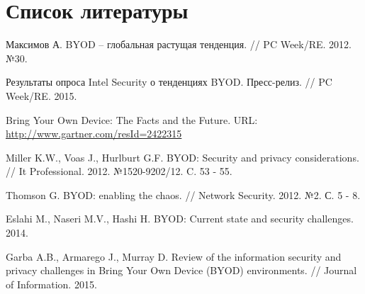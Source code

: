 \documentclass[a4paper, 12pt]{article}		%
\begin{document}
\section{Список литературы}

\begin{thebibliography}{00}

 Максимов А. BYOD -- глобальная растущая тенденция. // PC Week/RE. 2012. №30.

Результаты опроса Intel Security о тенденциях BYOD. Пресс-релиз. // PC Week/RE. 2015.

Bring Your Own Device: The Facts and the Future. URL: \url{http://www.gartner.com/resId=2422315}

 Miller K.W., Voas J., Hurlburt G.F. BYOD: Security and privacy considerations. // It Professional. 2012. №1520-9202/12. C. 53 - 55.

Thomson G. BYOD: enabling the chaos. // Network Security. 2012. №2. С. 5 - 8.

 Eslahi M., Naseri M.V., Hashi H. BYOD: Current state and security challenges. 2014.

 Garba A.B., Armarego J., Murray D. Review of the information security and privacy challenges in Bring Your Own Device (BYOD) environments. // Journal of Information. 2015.


\end{thebibliography}

\end{document}
